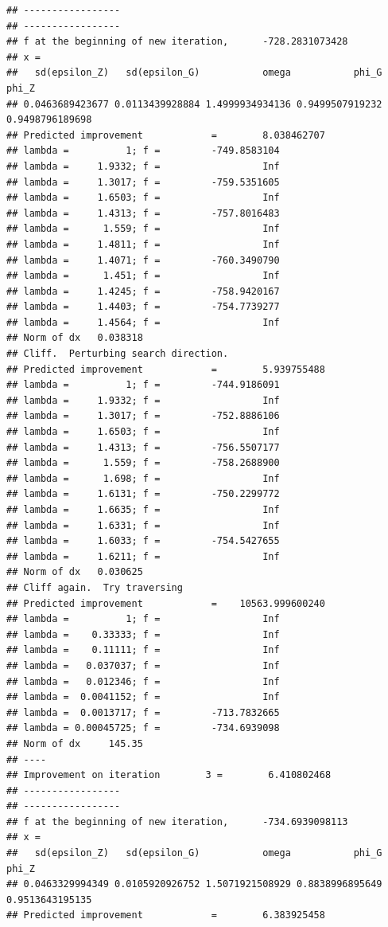 \documentclass[12pt,a4paper,]{article}
\newcommand{\0}{\mathbf{0}}
\begin{document}
\begin{verbatim}
## -----------------
## -----------------
## f at the beginning of new iteration,      -728.2831073428 
## x =
##   sd(epsilon_Z)   sd(epsilon_G)           omega           phi_G           phi_Z 
## 0.0463689423677 0.0113439928884 1.4999934934136 0.9499507919232 0.9498796189698 
## Predicted improvement            =        8.038462707
## lambda =          1; f =         -749.8583104 
## lambda =     1.9332; f =                  Inf 
## lambda =     1.3017; f =         -759.5351605 
## lambda =     1.6503; f =                  Inf 
## lambda =     1.4313; f =         -757.8016483 
## lambda =      1.559; f =                  Inf 
## lambda =     1.4811; f =                  Inf 
## lambda =     1.4071; f =         -760.3490790 
## lambda =      1.451; f =                  Inf 
## lambda =     1.4245; f =         -758.9420167 
## lambda =     1.4403; f =         -754.7739277 
## lambda =     1.4564; f =                  Inf 
## Norm of dx   0.038318
## Cliff.  Perturbing search direction. 
## Predicted improvement            =        5.939755488
## lambda =          1; f =         -744.9186091 
## lambda =     1.9332; f =                  Inf 
## lambda =     1.3017; f =         -752.8886106 
## lambda =     1.6503; f =                  Inf 
## lambda =     1.4313; f =         -756.5507177 
## lambda =      1.559; f =         -758.2688900 
## lambda =      1.698; f =                  Inf 
## lambda =     1.6131; f =         -750.2299772 
## lambda =     1.6635; f =                  Inf 
## lambda =     1.6331; f =                  Inf 
## lambda =     1.6033; f =         -754.5427655 
## lambda =     1.6211; f =                  Inf 
## Norm of dx   0.030625
## Cliff again.  Try traversing
## Predicted improvement            =    10563.999600240
## lambda =          1; f =                  Inf 
## lambda =    0.33333; f =                  Inf 
## lambda =    0.11111; f =                  Inf 
## lambda =   0.037037; f =                  Inf 
## lambda =   0.012346; f =                  Inf 
## lambda =  0.0041152; f =                  Inf 
## lambda =  0.0013717; f =         -713.7832665 
## lambda = 0.00045725; f =         -734.6939098 
## Norm of dx     145.35
## ----
## Improvement on iteration        3 =        6.410802468
## -----------------
## -----------------
## f at the beginning of new iteration,      -734.6939098113 
## x =
##   sd(epsilon_Z)   sd(epsilon_G)           omega           phi_G           phi_Z 
## 0.0463329994349 0.0105920926752 1.5071921508929 0.8838996895649 0.9513643195135 
## Predicted improvement            =        6.383925458

\end{verbatim}
\end{document}
